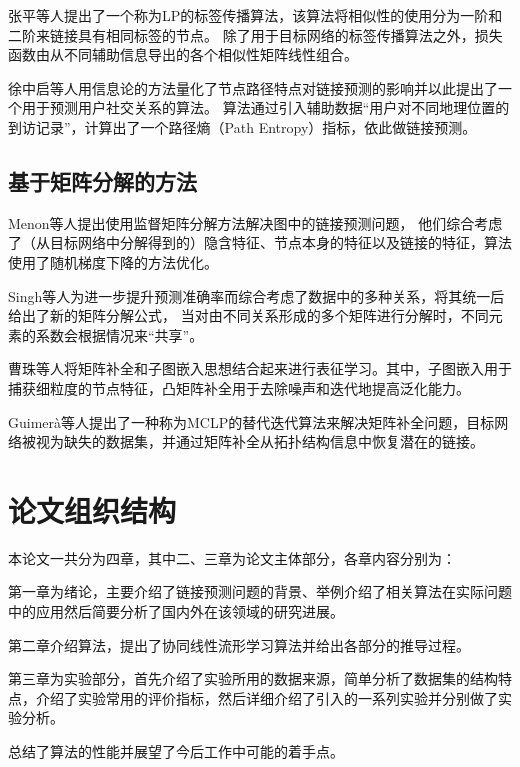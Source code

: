 张平等人提出了一个称为LP的标签传播算法\cite{zhang2015label}，该算法将相似性的使用分为一阶和二阶来链接具有相同标签的节点。
除了用于目标网络的标签传播算法之外，损失函数由从不同辅助信息导出的各个相似性矩阵线性组合。


徐中启等人用信息论的方法量化了节点路径特点对链接预测的影响并以此提出了一个用于预测用户社交关系的算法。
算法通过引入辅助数据“用户对不同地理位置的到访记录”，计算出了一个路径熵（Path Entropy）指标，依此做链接预测\cite{xu2016link}。

\subsection{基于矩阵分解的方法}
Menon等人提出使用监督矩阵分解方法解决图中的链接预测问题，
他们综合考虑了（从目标网络中分解得到的）隐含特征、节点本身的特征以及链接的特征，算法使用了随机梯度下降的方法优化\cite{singh2008relational}。


Singh等人为进一步提升预测准确率而综合考虑了数据中的多种关系，将其统一后给出了新的矩阵分解公式，
当对由不同关系形成的多个矩阵进行分解时，不同元素的系数会根据情况来“共享”。


曹珠等人将矩阵补全和子图嵌入思想结合起来进行表征学习。其中，子图嵌入用于捕获细粒度的节点特征，凸矩阵补全用于去除噪声和迭代地提高泛化能力\cite{cao2018link}。


Guimerà等人提出了一种称为MCLP的替代迭代算法来解决矩阵补全问题，目标网络被视为缺失的数据集，并通过矩阵补全从拓扑结构信息中恢复潜在的链接\cite{guimera2009missing}。

\section{论文组织结构}
本论文一共分为四章，其中二、三章为论文主体部分，各章内容分别为：


第一章为绪论，主要介绍了链接预测问题的背景、举例介绍了相关算法在实际问题中的应用然后简要分析了国内外在该领域的研究进展。


第二章介绍算法，提出了协同线性流形学习算法并给出各部分的推导过程。


第三章为实验部分，首先介绍了实验所用的数据来源，简单分析了数据集的结构特点，介绍了实验常用的评价指标，然后详细介绍了引入的一系列实验并分别做了实验分析。


总结了算法的性能并展望了今后工作中可能的着手点。